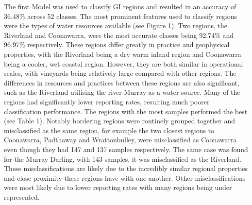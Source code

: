 \documentclass[review,12pt,authoryear]{elsarticle}
\begin{document}
\begin{linenumbers}
The first Model was used to classify GI regions %
and resulted in an accuracy of 36.48\% across 52 classes. The most prominent features used to classify regions were the types of water resources available (see Figure 1). Two regions, the Riverland and Coonawarra, were the most accurate classes being 92.74\% and 96.97\% respectively.
These regions differ greatly in practice and geophysical properties, with the Riverland being a dry warm inland region and Coonawarra being a cooler, wet coastal region. However, they are both similar in operational scales, with vineyards being relatively large compared with other regions.
%
%
The differences in resources and practices between these regions are also significant, such as the Riverland utilising the river Murray as a water source.
Many of the regions had significantly lower reporting rates, resulting much poorer classification performance. %
 The regions with the most samples performed the best (see Table 1). Notably bordering regions were routinely grouped together and misclassified as the same region, for example the two closest regions to Coonawarra, Padthaway and Wrattonbulley, were misclassified as Coonawarra even though they had 147 and 137 samples respectively. The same case was found for the Murray Darling, with 143 samples, it was misclassified as the Riverland.
These misclassifications are likely due to the incredibly similar regional properties and close proximity these regions have with one another. Other misclassifications were most likely due to lower reporting rates with many regions being under represented.


\end{linenumbers}
\end{document}
